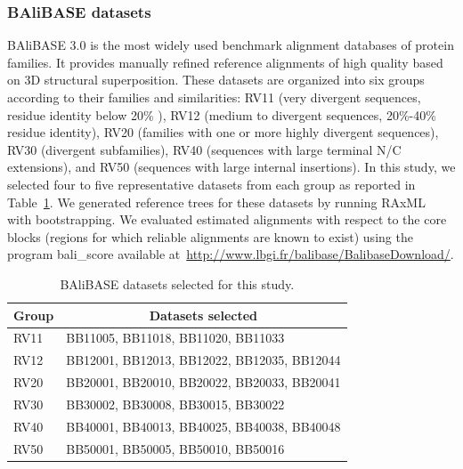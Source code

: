 \subsubsection{BAliBASE datasets}\label{subsec:balibase_stat}
BAliBASE 3.0 \citep{thompson2005balibase} is the most widely used benchmark alignment databases of protein families. It provides manually refined reference alignments of high quality based on 3D structural superposition. These datasets are organized into six groups according to their families and similarities: RV11 (very divergent sequences, residue identity below 20\% ), RV12 (medium to divergent sequences, 20\%-40\% residue identity), RV20 (families with one or more highly divergent sequences), RV30 (divergent subfamilies), RV40 (sequences with large terminal N/C extensions), and RV50 (sequences with large internal insertions). In this study, we selected four to five representative datasets from each group as reported in Table~\ref{tab:balibase}. We generated reference trees for these datasets by running RAxML~\citep{stamatakis2014raxml} with bootstrapping. We evaluated estimated alignments with respect to the core blocks (regions for which reliable alignments are known to exist) using the program bali\_score available at~\url{http://www.lbgi.fr/balibase/BalibaseDownload/}.

\begin{table}[htbp]
	\small
	\centering
	\caption{ BAliBASE datasets selected for this study.}
	\begin{tabular}{|l|l|}
		\hline
		\multicolumn{1}{|c|}{Group} & \multicolumn{1}{c|}{Datasets selected} \\
		\hline
		RV11  & BB11005, BB11018, BB11020, BB11033 \\
		\hline
		RV12  & BB12001, BB12013, BB12022, BB12035, BB12044 \\
		\hline
		RV20  & BB20001, BB20010, BB20022, BB20033, BB20041 \\
		\hline
		RV30  & BB30002, BB30008, BB30015, BB30022 \\
		\hline
		RV40  & BB40001, BB40013, BB40025, BB40038, BB40048 \\ %
		\hline
		RV50  & BB50001, BB50005, BB50010, BB50016 \\
		\hline
	\end{tabular}%
	\label{tab:balibase}%
\end{table}%

